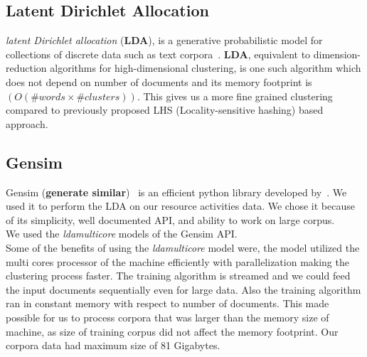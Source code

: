 \subsection{Latent Dirichlet Allocation}
\label{sub:LDA}
\textit{latent Dirichlet allocation} (\textbf{LDA}), is a generative probabilistic model for collections of discrete data such as text corpora~\cite[LDA]{Blei}.
\textbf{LDA}, equivalent to dimension-reduction algorithms for high-dimensional clustering, is one such algorithm which does not depend on number of documents and its memory footprint is $(O(\#words\times \#clusters))$.
This gives us a more fine grained clustering compared to previously proposed LHS (Locality-sensitive hashing) based approach.\\
\subsection{Gensim}
\label{sub:Gensim}
Gensim (\textbf{generate similar})~\cite[]{gensim} is an efficient python library developed by~\citeauthor{gensim}. We used it to perform the LDA on our resource activities data. We chose it because of its simplicity, well documented API, and ability to work on large corpus.\\
We used the \emph{ldamulticore}\cite[]{ldamulticore}  models of the Gensim API.\\
Some of the benefits of using the \emph{ldamulticore} model were, the model utilized the multi cores processor of the machine efficiently with parallelization making the clustering process faster.
The training algorithm is streamed and we could feed the input documents sequentially even for large data.
Also the training algorithm ran in constant memory with respect to number of documents. This made possible for us to process corpora that was larger than the memory size of machine, as size of training corpus did not affect the memory footprint. Our corpora data had maximum size of 81 Gigabytes.

